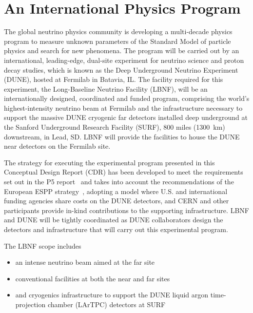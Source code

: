 
\section{An International Physics Program}

The global neutrino physics community is developing a multi-decade
physics program to measure unknown parameters of the Standard Model of
particle physics and search for new phenomena.  
The program will be carried out by an international,
leading-edge, dual-site experiment
for neutrino science and proton decay studies, which is known as the Deep Underground
Neutrino Experiment (DUNE), hosted at Fermilab in Batavia, IL. The
facility required for this experiment, the Long-Baseline Neutrino
Facility (LBNF), will be an internationally designed, coordinated and
funded program, comprising the world's highest-intensity neutrino beam
at Fermilab and the infrastructure necessary to support the massive
DUNE cryogenic far detectors installed deep underground at the Sanford
Underground Research Facility (SURF), \num{800} miles (\SI{1300}{\km}) downstream,
in Lead, SD. LBNF will provide the facilities to house the DUNE near
detectors on the Fermilab site. %

The strategy for executing the experimental program presented in this Conceptual 
Design Report (CDR) has been developed to meet the requirements 
set out in the P5 report~\cite{p5report} and takes into account the recommendations of the European 
ESPP strategy~\cite{ESPP-2012}, adopting a model where U.S. and international funding agencies 
share costs on the DUNE detectors, and CERN and other participants provide in-kind contributions 
to the supporting infrastructure. LBNF and DUNE will be tightly
coordinated as DUNE collaborators design the detectors and
infrastructure that will carry out this experimental program.
  
The LBNF scope includes
\begin{itemize}
\item an intense neutrino beam aimed at the far site
\item conventional facilities at both the near and far sites
\item and cryogenics infrastructure to support the DUNE
  liquid argon time-projection chamber (LArTPC) detectors at SURF
\end{itemize}

